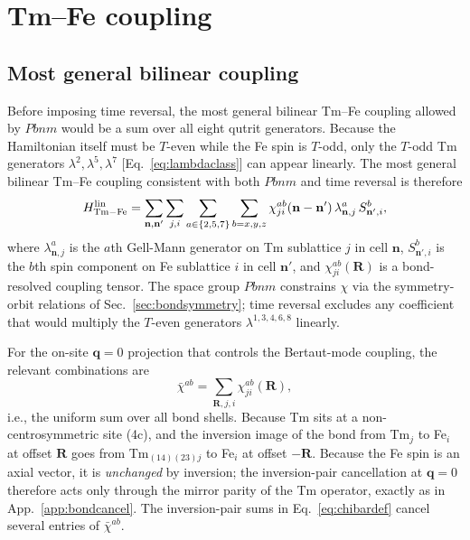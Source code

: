 \documentclass[reprint,amsmath,amssymb,aps,prb,longbibliography]{revtex4-2}
\begin{document}
\section{Tm--Fe coupling}
\label{sec:TmFe}

\subsection{Most general bilinear coupling}

Before imposing time reversal, the most general bilinear Tm--Fe coupling
allowed by $Pbnm$ would be a sum over all eight qutrit generators.
Because the Hamiltonian itself must be $T$-even while the Fe spin is
$T$-odd, only the $T$-odd Tm generators
$\lambda^2,\lambda^5,\lambda^7$ [Eq.~\eqref{eq:lambdaclass}] can appear
linearly. The most general bilinear Tm--Fe coupling consistent with both
$Pbnm$ and time reversal is therefore
\begin{equation}
H_{\rm Tm-Fe}^{\rm lin} = \sum_{\mathbf n,\mathbf n'}\sum_{j,i}\sum_{a\in\{2,5,7\}}\sum_{b=x,y,z}
\chi^{ab}_{ji}(\mathbf n - \mathbf n')\,\lambda^a_{\mathbf n,j}\,S^b_{\mathbf n',i},
\label{eq:Hlingen}
\end{equation}
where $\lambda^a_{\mathbf n,j}$ is the $a$th Gell-Mann generator on
Tm sublattice $j$ in cell $\mathbf n$, $S^b_{\mathbf n',i}$ is the $b$th
spin component on Fe sublattice $i$ in cell $\mathbf n'$, and
$\chi^{ab}_{ji}(\mathbf R)$ is a bond-resolved coupling tensor. The space
group $Pbnm$ constrains $\chi$ via the symmetry-orbit relations of
Sec.~\ref{sec:bondsymmetry}; time reversal excludes any coefficient that
would multiply the $T$-even generators $\lambda^{1,3,4,6,8}$ linearly.

For the on-site $\mathbf q\!=\!0$ projection that controls the
Bertaut-mode coupling, the relevant combinations are
\begin{equation}
\bar\chi^{ab} = \sum_{\mathbf R, j, i}\chi^{ab}_{ji}(\mathbf R),
\label{eq:chibardef}
\end{equation}
i.e., the uniform sum over all bond shells. Because Tm sits at a
non-centrosymmetric site (4c), and the inversion image of the bond from
Tm$_j$ to Fe$_i$ at offset $\mathbf R$ goes from Tm$_{(14)(23)j}$ to
Fe$_i$ at offset $-\mathbf R$. Because the Fe spin is an axial vector,
it is \emph{unchanged} by inversion; the inversion-pair cancellation at
$\mathbf q=0$ therefore acts only through the mirror parity of the Tm
operator, exactly as in App.~\ref{app:bondcancel}. The inversion-pair
sums in Eq.~\eqref{eq:chibardef} cancel
several entries of $\bar\chi^{ab}$.
\end{document}
